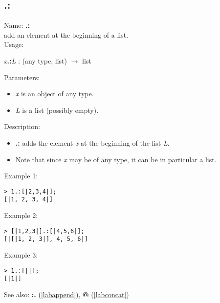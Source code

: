 \subsection{.:}
\label{labprepend}
\noindent Name: \textbf{.:}\\
add an element at the beginning of a list.\\
\noindent Usage: 
\begin{center}
\emph{x}\textbf{.:}\emph{L} : (\textsf{any type}, \textsf{list}) $\rightarrow$ \textsf{list}\\
\end{center}
Parameters: 
\begin{itemize}
\item \emph{x} is an object of any type.
\item \emph{L} is a list (possibly empty).
\end{itemize}
\noindent Description: \begin{itemize}

\item \textbf{.:} adds the element \emph{x} at the beginning of the list \emph{L}.

\item Note that since \emph{x} may be of any type, it can be in particular a list.
\end{itemize}
\noindent Example 1: 
\begin{center}\begin{minipage}{15cm}\begin{Verbatim}[frame=single]
> 1.:[|2,3,4|];
[|1, 2, 3, 4|]
\end{Verbatim}
\end{minipage}\end{center}
\noindent Example 2: 
\begin{center}\begin{minipage}{15cm}\begin{Verbatim}[frame=single]
> [|1,2,3|].:[|4,5,6|];
[|[|1, 2, 3|], 4, 5, 6|]
\end{Verbatim}
\end{minipage}\end{center}
\noindent Example 3: 
\begin{center}\begin{minipage}{15cm}\begin{Verbatim}[frame=single]
> 1.:[||];
[|1|]
\end{Verbatim}
\end{minipage}\end{center}
See also: \textbf{:.} (\ref{labappend}), \textbf{@} (\ref{labconcat})
